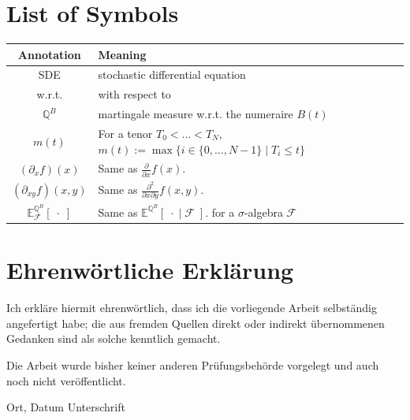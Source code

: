 \documentclass[12pt]{article}
\begin{document}
	
	
	\pagebreak
	\section{List of Symbols}
	\begin{tabular}{cl}
		
		Annotation & Meaning \\
		\hline
		SDE & stochastic differential equation \\
		w.r.t. & with respect to \\
		$\mathbb{Q}^B$ & martingale measure w.r.t. the numeraire $B(t)$\\
		$m(t)$ & For a tenor $T_0 < ... < T_N$, $m(t):= \max\{i \in \{0, ..., N-1\} \; | \; T_i \le t \}$\\
		$(\partial_{x}f)(x)$ & Same as $\frac{\partial}{\partial x}f(x)$.\\
		$(\partial_{x y}f)(x, y)$ & Same as $\frac{\partial^2}{\partial x \partial y}f(x, y)$.\\
		$\mathbb{E}^{\mathbb{Q}^B}_{\mathcal{F}}\left[ \; \cdot \; \right]$ & Same as
		$\mathbb{E}^{\mathbb{Q}^B}\left[ \; \cdot \; | \; \mathcal{F} \; \right].$ for a $\sigma$-algebra $\mathcal{F}$\\
		
	\end{tabular}
	\pagebreak
		
		
		
		
		
		
	\newpage
	\thispagestyle{empty}
	\clearpage
	
	\section*{Ehrenwörtliche Erklärung}
	
	Ich erkläre hiermit ehrenwörtlich, dass ich die vorliegende Arbeit selbständig angefertigt habe; die aus fremden Quellen direkt oder indirekt übernommenen Gedanken sind als solche kenntlich gemacht.
	\par \bigskip
	\noindent Die Arbeit wurde bisher keiner anderen Prüfungsbehörde vorgelegt und auch noch nicht veröffentlicht.
	
	\vspace{4cm}
	
	\hspace{2cm} Ort, Datum \hfill Unterschrift \hspace{2cm}
	\pagebreak
\end{document}
